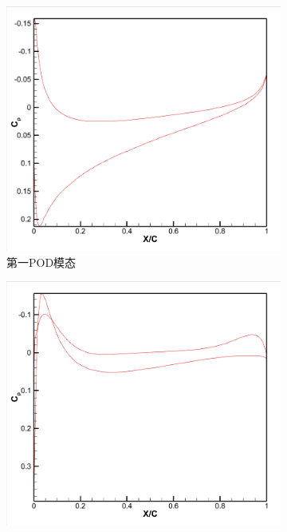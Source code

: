 \begin{figure}[H]
    \centering
    \begin{subfigure}[b]{0.32\textwidth}
        \includegraphics[width=\textwidth]{image/基压力分布图/多变量表面压力基1.png}
        \caption{第一POD模态}
    \end{subfigure}
    \begin{subfigure}[b]{0.32\textwidth}
        \includegraphics[width=\textwidth]{image/基压力分布图/多变量表面压力基2.png}

\end{subfigure}
\end{figure}
